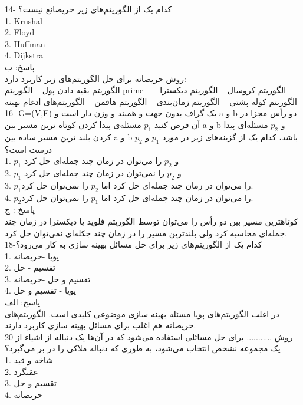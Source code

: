 \documentclass{book}
\begin{document}
14-  کدام یک از الگوریتم‌های زیر حریصانع نیست؟\\
1. Krushal \\
2. Floyd \\  
3. Huffman \\
4. Dijkstra  \\

پاسخ: ب\\
روش حریصانه برای حل الگوریتم‌های زیر کاربرد دارد:\\
الگوریتم بقیه دادن پول -- الگوریتم prime -- الگوریتم کروسال -- الگوریتم دیکسترا -- الگوریتم کوله پشتی -- الگوریتم زمان‌بندی -- الگوریتم هافمن -- الگوریتم‌های ادغام بهینه \\

16- G=(V,E) یک گراف بدون جهت و همبند و وزن دار است و a و b دو رأس مجزا در آن فرض کنید $p_1$ مسئله‌ی پیدا کردن کوتاه ترین مسیر بین a و b و $p_2$ مسئله‌ای پیدا کردن بلند ترین مسیر ساده بین a و b باشد، کدام یک از گزینه‌های زیر در مورد $p_1$ و $p_2$ درست است؟\\
1.  $p_1$ و $p_2$  را می‌توان در زمان چند جمله‌ای حل کرد\\
2. $p_1$ و $p_2$  را نمی‌توان در زمان چند جمله‌ای حل کرد\\
3.  $p_1$را می‌توان در زمان چند جمله‌ای حل کرد اما  $p_2$  را نمی‌توان حل کرد.\\
4.  $p_2$را می‌توان در زمان چند جمله‌ای حل کرد اما  $p_1$  را نمی‌توان حل کرد.\\

پاسخ : ج\\
کوتاهترین مسیر بین دو رأس را می‌توان توسط الگوریتم فلوید یا دیکسترا در زمان چند جمله‌ای محاسبه کرد ولی بلندترین مسیر را در زمان چند جکله‌ای نمی‌توان حل کرد.\\

18-کدام یک از الگوریتم‌های زیر برای حل مسائل بهینه سازی به کار می‌رود؟\\
1. پویا -حریصانه\\
2. تقسیم - حل\\
3. تقسیم و حل -حریصانه\\
4. پویا - تقسیم و حل\\

پاسخ: الف\\
در اغلب الگوریتم‌های پویا مسئله بهینه سازی موضوعی کلیدی است. الگوریتم‌های حریصانه هم اغلب برای مسائل بهینه سازی کاربرد دارند.\\

20-روش ........... برای حل مسائلی استفاده می‌شود که در آن‌ها یک دنباله از اشیاء از یک مجموعه نشخص انتخاب می‌شود، به طوری که دنباله ملاکی را در بر می‌گیرد؟\\
1. شاخه و قید\\
2. عقبگرد \\
3. تقسیم و حل\\
4. حریصانه\\
\end{document}
